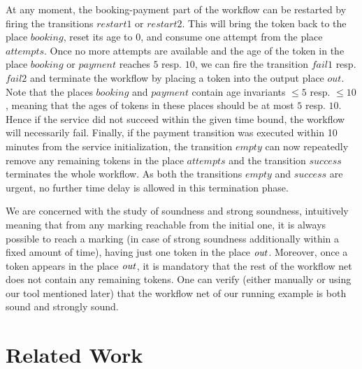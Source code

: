 At any moment, the booking-payment part of the workflow can be
restarted by firing the transitions $\mathit{restart1}$ or
$\mathit{restart2}$. This will bring the token back to the place
$\mathit{booking}$, reset its age to $0$, and consume one attempt from
the place $\mathit{attempts}$. Once no more attempts are available
and the age of the token in the place $\mathit{booking}$ or
$\mathit{payment}$ reaches $5$ resp. $10$, we can fire
the transition $\mathit{fail1}$ resp. $\mathit{fail2}$ and terminate the
workflow by placing a token into the output place $\mathit{out}$.
Note that the places $\mathit{booking}$ and $\mathit{payment}$ contain
age invariants $\leq 5$ resp. $\leq 10$, meaning that the ages of tokens in 
these places should be at most $5$ resp. $10$. Hence if the service
did not succeed within the given time bound, the workflow will necessarily
fail.
Finally, if the payment transition was executed within 10 minutes
from the service initialization, the transition
$\mathit{empty}$ can now repeatedly remove any remaining tokens in the place
$\mathit{attempts}$ and the transition $\mathit{success}$ terminates 
the whole workflow. As both the transitions
$\mathit{empty}$ and $\mathit{success}$ are urgent, no further time delay
is allowed in this termination phase.

We are concerned with the study of
soundness and strong soundness, intuitively meaning that from any
marking reachable from the initial one, it is always possible
to reach a marking (in case of strong soundness additionally within a fixed
amount of time), having just one token in the place ${\mathit{out}}$.
Moreover, once a token appears in the place ${\mathit{out}}$, it is mandatory
that the rest of the workflow net does not contain any remaining tokens.
One can verify (either manually or using our tool mentioned later)
that the workflow net of our running example is both sound and strongly sound.

\section*{Related Work}

